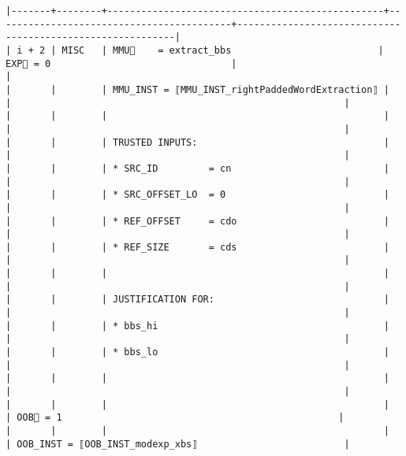 \documentclass[varwidth=\maxdimen,margin=0.5cm,multi={verbatim}]{standalone}
\begin{document}
\begin{verbatim}
|-------+--------+-------------------------------------------------+------------------------------------------+-----------------------------------------------------------|
| i + 2 | MISC   | MMU🏴    = extract_bbs                          | EXP🏴 = 0                                |                                                           |
|       |        | MMU_INST = ⟦MMU_INST_rightPaddedWordExtraction⟧ |                                          |                                                           |
|       |        |                                                 |                                          |                                                           |
|       |        | TRUSTED INPUTS:                                 |                                          |                                                           |
|       |        | * SRC_ID         = cn                           |                                          |                                                           |
|       |        | * SRC_OFFSET_LO  = 0                            |                                          |                                                           |
|       |        | * REF_OFFSET     = cdo                          |                                          |                                                           |
|       |        | * REF_SIZE       = cds                          |                                          |                                                           |
|       |        |                                                 |                                          |                                                           |
|       |        | JUSTIFICATION FOR:                              |                                          |                                                           |
|       |        | * bbs_hi                                        |                                          |                                                           |
|       |        | * bbs_lo                                        |                                          |                                                           |
|       |        |                                                 |                                          |                                                           |
|       |        |                                                 |                                          | OOB🏴 = 1                                                 |
|       |        |                                                 |                                          | OOB_INST = ⟦OOB_INST_modexp_xbs⟧                          |

\end{verbatim}
\end{document}
